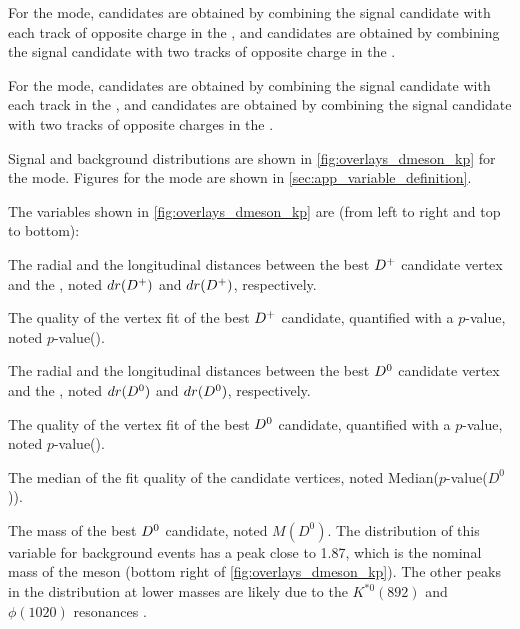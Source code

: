 For the \BKpnn mode, \Dz candidates are obtained by combining the signal \Kp candidate with each track of opposite charge in the \ROE, and \Dp candidates are obtained by combining the signal \Kp candidate with two tracks of opposite charge in the \ROE.

For the \BKznn mode, \Dp candidates are obtained by combining the signal \KS candidate with each track in the \ROE, and \Dz candidates are obtained by combining the signal \KS candidate with two tracks of opposite charges in the \ROE.

Signal and background distributions are shown in \cref{fig:overlays_dmeson_kp} for the \BKpnn mode.
Figures for the \BKznn mode are shown in \cref{sec:app_variable_definition}.

The variables shown in \cref{fig:overlays_dmeson_kp} are (from left to right and top to bottom):
\bi
\item The radial and the longitudinal distances between the best $D^+$ candidate vertex and the \IP, noted $dr(D^+)$ and $dr(D^+)$, respectively.
\item The quality of the vertex fit of the best $D^+$ candidate, quantified with a $p$-value, noted $p$-value(\Dp).
\item The radial and the longitudinal distances between the best $D^0$ candidate vertex and the \IP, noted $dr(D^0)$ and $dr(D^0)$, respectively.
\item The quality of the vertex fit of the best $D^0$ candidate, quantified with a $p$-value, noted $p$-value(\Dz).
\item The median of the fit quality of the \Dz candidate vertices, noted Median($p$-value($D^0$)).
\item The mass of the best $D^0$ candidate, noted $M(D^0)$.
The distribution of this variable for background events has a peak close to 1.87\gevcc, which is the nominal mass of the \Dz meson \cite{ParticleDataGroup:2020ssz} (bottom right of \cref{fig:overlays_dmeson_kp}).
The other peaks in the distribution at lower masses are likely due to the $K^{*0}(892)$ and $\phi(1020)$ resonances \cite{ParticleDataGroup:2020ssz}.
\ei

